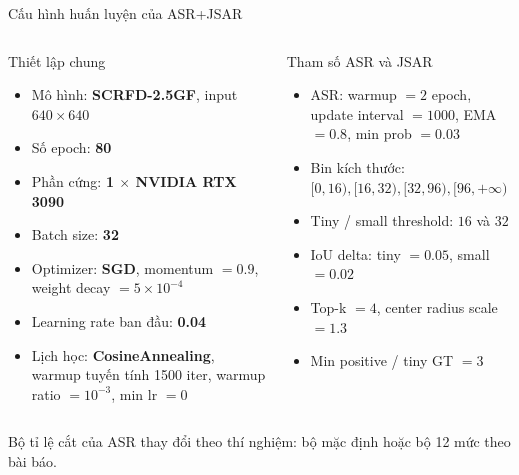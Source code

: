 \documentclass[aspectratio=169,11pt]{beamer}
\begin{document}
\begin{frame}{Cấu hình huấn luyện của ASR+JSAR}
  \scriptsize
  \begin{columns}[T,onlytextwidth]
    \begin{block}{Thiết lập chung}
      \begin{itemize}
        \item Mô hình: \textbf{SCRFD-2.5GF}, input \(640\times640\)
        \item Số epoch: \textbf{80}
        \item Phần cứng: \textbf{1 $\times$ NVIDIA RTX 3090}
        \item Batch size: \textbf{32}
        \item Optimizer: \textbf{SGD}, momentum \(=0.9\), weight decay \(=5\times10^{-4}\)
        \item Learning rate ban đầu: \textbf{0.04}
        \item Lịch học: \textbf{CosineAnnealing}, warmup tuyến tính 1500 iter, warmup ratio \(=10^{-3}\), min lr \(=0\)
      \end{itemize}
    \end{block}
    \begin{block}{Tham số ASR và JSAR}
      \begin{itemize}
        \item ASR: warmup \(=2\) epoch, update interval \(=1000\), EMA \(=0.8\), min prob \(=0.03\)
        \item Bin kích thước: \([0,16), [16,32), [32,96), [96,+\infty)\)
        \item Tiny / small threshold: \(16\) và \(32\)
        \item IoU delta: tiny \(=0.05\), small \(=0.02\)
        \item Top-k \(=4\), center radius scale \(=1.3\)
        \item Min positive / tiny GT \(=3\)
      \end{itemize}
    \end{block}
  \end{columns}
  \vspace{0.05cm}
  Bộ tỉ lệ cắt của ASR thay đổi theo thí nghiệm: bộ mặc định hoặc bộ 12 mức theo bài báo.
\end{frame}
\end{document}
